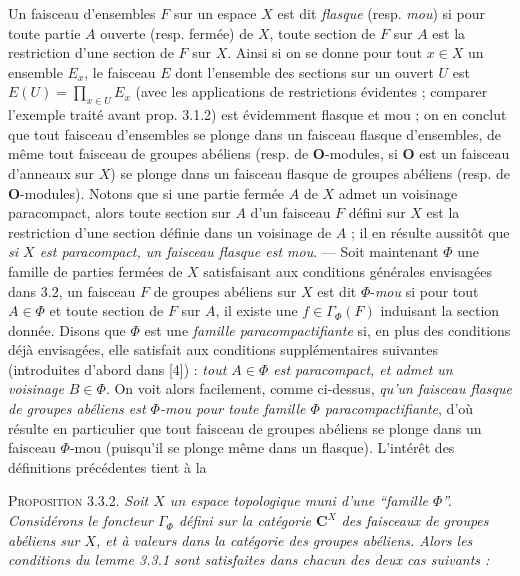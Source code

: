 
Un faisceau d'ensembles $F$ sur un espace $X$ est dit \textit{flasque}
(resp. \textit{mou}) si pour toute partie $A$ ouverte (resp. fermée) de $X$,
toute section de $F$ sur $A$ est la restriction d'une section de $F$ sur
$X$. Ainsi si on se donne pour tout $x\in X$ un ensemble $E_x$, le faisceau
$E$ dont l'ensemble des sections sur un ouvert $U$ est
$E(U)=\displaystyle\prod_{x\in U}E_x$
(avec les applications de restrictions évidentes ; comparer l'exemple traité
avant prop. 3.1.2) est évidemment flasque et mou ; on en conclut que tout
faisceau d'ensembles se plonge dans un faisceau flasque d'ensembles, de même
tout faisceau de groupes abéliens (resp. de $\mathbf O$-modules, si
$\mathbf O$ est un faisceau d'anneaux sur $X$) se plonge dans un faisceau
flasque de groupes abéliens (resp. de $\mathbf O$-modules). Notons que si une
partie fermée $A$ de $X$ admet un voisinage paracompact, alors toute section
sur $A$ d'un faisceau $F$ défini sur $X$ est la restriction d'une section
définie dans un voisinage de $A$ ; il en résulte aussitôt que
\textit{si $X$ est paracompact, un faisceau flasque est mou}. ---
Soit maintenant $\Phi$ une famille de parties fermées de $X$ satisfaisant aux
conditions générales envisagées dans 3.2, un faisceau $F$ de groupes abéliens
sur $X$ est dit $\Phi$-\textit{mou} si pour tout $A\in\Phi$ et toute section
de $F$ sur $A$, il existe une $f\in\Gamma_\Phi(F)$ induisant la section
donnée. Disons que $\Phi$ est une \textit{famille paracompactifiante} si, en
plus des conditions déjà envisagées, elle satisfait aux conditions
supplémentaires suivantes (introduites d'abord dans [4]) :
\textit{tout $A\in\Phi$ est paracompact, et admet un voisinage $B\in\Phi$}.
On voit alors facilement, comme ci-dessus, \textit{qu'un faisceau flasque de
groupes abéliens est $\Phi$-mou pour toute famille $\Phi$
paracompactifiante}, d'où résulte en particulier que tout faisceau de groupes
abéliens se plonge dans un faisceau $\Phi$-mou (puisqu'il se plonge même dans
un flasque). L'intérêt des définitions précédentes tient à la

\indent\textsc{Proposition 3.3.2.} \textit{Soit $X$ un espace topologique muni
d'une ``famille $\Phi$''. Considérons le foncteur $\Gamma_\Phi$ défini
sur la catégorie $\mathbf C^X$ des faisceaux de groupes abéliens sur $X$, et à
valeurs dans la catégorie des groupes abéliens. Alors les conditions du lemme
\textup{3.3.1} sont satisfaites dans chacun des deux cas suivants :}

